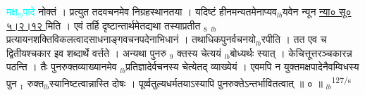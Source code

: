 \documentclass[article,12pt,a4paper]{memoir}%
\newcommand{\quotelemma}[1]{\textcolor{cyan}{#1}}
\newcounter{parCount}
\begin{document}
\quotelemma{मक्ष{\tiny $_{lb}$}पादे} नोक्तं । प्रत्युत तदवचनमेव निग्रहस्थानतया । यदिष्टं हीनमन्यतमेनाप्यव{\tiny $_{lb}$}यवेन न्यून \href{http://sarit.indology.info/?cref=ns\%C5\%AB.5.2.12}{न्या० सू० ५।२।१२ } मिति । एवं तर्हि दृष्टान्तार्थमेतद्यथा तस्याप्रतीत {\tiny $_{8}$} {\tiny $_{lb}$}प्रत्यायनशक्तिविकलत्वादसाधनाङ्गवचनपदेनाभिधानं । तथाधिकपुनर्वचनयो{\tiny $_{lb}$}रपीति । तत एव च द्वितीयश्चकार इव शब्दार्थे वर्त्तते । अन्यथा पुनरु {\tiny $_{9}$} \leavevmode{} क्तस्य चेत्ययं {\tiny $_{lb}$}बोध्यर्थः स्यात् । केचित्तूत्तरञ्चकारन्न पठन्ति । तैः पुनरुक्तव्याख्यानमेव {\tiny $_{lb}$}प्रतिज्ञादेर्वचनस्य चेत्येतद् व्याख्येयं । एवमपि न युक्तमक्षपादेनैवम्विधस्य पुन {\tiny $_{1}$} रुक्त{\tiny $_{lb}$}स्यानिष्टत्वान्नास्ति दोषः । पूर्व्वतुल्यधर्मतयाऽस्यापि पुनरुक्तेऽन्तर्भावितत्वात् ॥ ० ॥
	{}
	\pend%
      {\tiny $_{lb}$}\textsuperscript{\textenglish{127/s}}
\end{document}
